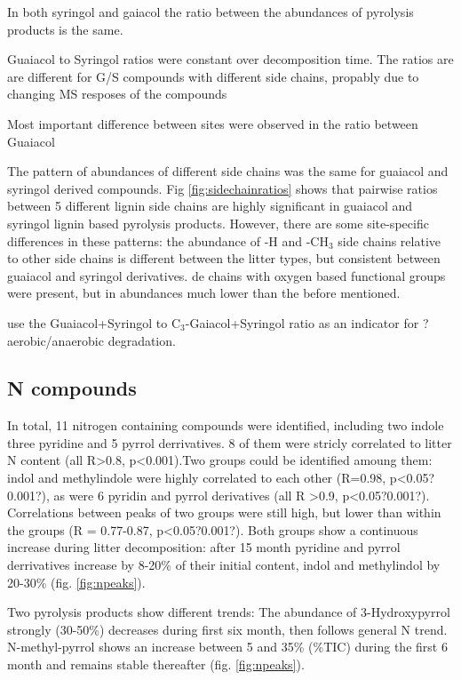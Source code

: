 \documentclass[preprint,review,12pt]{elsarticle}
\begin{document}
In both syringol and gaiacol the ratio between the abundances of pyrolysis products is the same.

Guaiacol to Syringol ratios were constant over decomposition time. The ratios are are different for G/S compounds with different side chains, propably due to changing MS resposes of the compounds

Most important difference between sites were observed in the ratio between Guaiacol

The pattern of abundances of different side chains was the same for guaiacol and syringol derived compounds. Fig \ref{fig:sidechainratios} shows that pairwise ratios between 5 different lignin side chains are highly significant in guaiacol and syringol lignin based pyrolysis products. However, there are some site-specific differences in these patterns: the abundance of -H and -CH$_3$ side chains relative to other side chains is different between the litter types, but consistent between guaiacol and syringol derivatives.
de chains with oxygen based functional groups were present, but in abundances much lower than the before mentioned.


\cite{Kuder1998, Schellekens2009} use the Guaiacol+Syringol to C$_3$-Gaiacol+Syringol ratio as an indicator for ?aerobic/anaerobic degradation. 

\subsection{N compounds}


In total, 11 nitrogen containing compounds were identified, including two indole three pyridine and 5 pyrrol derrivatives. 8 of them were stricly correlated to litter N content (all R\textgreater 0.8, p\textless 0.001).Two groups could be identified amoung them: indol and methylindole were highly correlated to each other (R=0.98, p\textless 0.05?0.001?), as were 6 pyridin and pyrrol derivatives (all R \textgreater 0.9, p\textless 0.05?0.001?). Correlations between peaks of two groups were still high, but lower than within the groups (R = 0.77-0.87, p\textless 0.05?0.001?). Both groups show a continuous increase during litter decomposition: after 15 month pyridine and pyrrol derrivatives increase by 8-20\% of their initial content, indol and methylindol by 20-30\% (fig. \ref{fig:npeaks}).

Two pyrolysis products show different trends:  The abundance of 3-Hydroxypyrrol strongly (30-50\%) decreases during first six month, then follows general N trend. N-methyl-pyrrol shows an increase between 5 and 35\% (\%TIC) during the first 6 month and remains stable thereafter (fig. \ref{fig:npeaks}).
\end{document}
